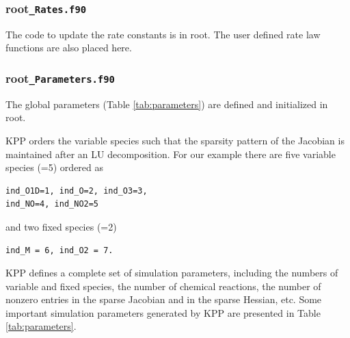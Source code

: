 \documentclass[twoside]{article}
\newcommand{\kpproot}{{\sc root}}
\begin{document}
\subsubsection{\kpproot{\tt\_Rates.f90}}
\label{sec:output-rates}

The code to update the rate constants is in \kpproot{}.
The user defined rate law functions are also placed here.

\subsubsection{\kpproot{\tt\_Parameters.f90}}
\label{sec:output-parameters}

The global parameters (Table \ref{tab:parameters}) are defined and
initialized in \kpproot{}.

KPP orders the variable species such that the sparsity pattern of the
Jacobian is maintained after an LU decomposition. For our
 example there are five variable species
(=5) ordered as
%
\begin{verbatim}
ind_O1D=1, ind_O=2, ind_O3=3,
ind_NO=4, ind_NO2=5
\end{verbatim}
%
and two fixed species (=2)
%
\begin{verbatim}
ind_M = 6, ind_O2 = 7.
\end{verbatim}
%
KPP defines a complete set of simulation parameters, including the numbers
of variable and fixed species, the number of chemical reactions, the
number of nonzero entries in the sparse Jacobian and in the sparse
Hessian, etc. Some important simulation parameters generated by KPP are
presented in Table \ref{tab:parameters}.
\end{document}
